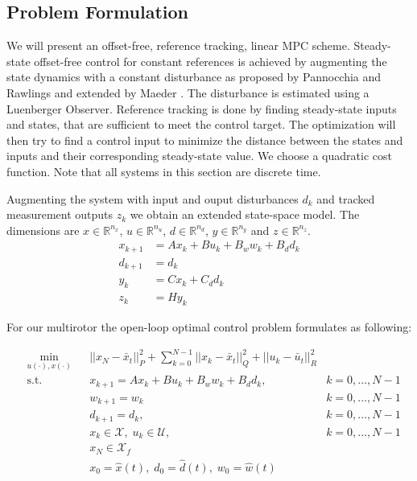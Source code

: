 \subsection{Problem Formulation}
We will present an offset-free, reference tracking, linear MPC scheme. Steady-state offset-free control for constant references is achieved by augmenting the state dynamics with a constant disturbance as proposed by Pannocchia and Rawlings and extended by Maeder \cite{Pannocchia2003a,Maeder2009}. The disturbance is estimated using a Luenberger Observer. Reference tracking is done by finding steady-state inputs and states, that are sufficient to meet the control target. The optimization will then try to find a control input to minimize the distance between the states and inputs and their corresponding steady-state value. We choose a quadratic cost function. Note that all systems in this section are discrete time. 

Augmenting the system with input and ouput disturbances $d_k$ and tracked measurement outputs $z_k$ we obtain an extended state-space model. The dimensions are $x\in\mathbb{R}^{n_x}$, $u\in\mathbb{R}^{n_u}$, $d\in\mathbb{R}^{n_d}$, $y\in\mathbb{R}^{n_y}$ and $z\in\mathbb{R}^{n_z}$.
\begin{align}
x_{k+1} &= A x_k + B u_k + B_w w_k + B_d d_k \label{eq:MPC_dt}\\
d_{k+1} &= d_k \nonumber \\ 
y_{k} &= C x_k + C_d d_k \nonumber \\
z_k &= H y_k 
\end{align}

For our multirotor the open-loop optimal control problem formulates as following:

\begin{align}
&\min_{u(\cdot),x(\cdot)}
& & ||x_N-\bar{x}_t||_P^2 + \sum_{k=0}^{N-1} ||x_k - \bar{x}_t||_Q^2 + ||u_k - \bar{u}_t||_R^2  \nonumber\\
& \text{s.t.} 
& & x_{k+1} = A x_k + B u_k + B_w w_k + B_d d_k, & k = 0, \ldots, N-1 \nonumber\\
& & & w_{k+1} = w_k  & k = 0, \ldots, N-1 \nonumber\\
& & & d_{k+1} = d_k, & k = 0, \ldots, N-1 \nonumber\\
& & & x_k \in \mathcal{X}, \; u_k \in \mathcal{U}, & k = 0, \ldots, N-1 \nonumber\\
& & & x_N \in \mathcal{X}_f \nonumber\\
& & & x_0 = \hat x (t), \; d_0 = \hat d(t), \; w_0 = \hat w(t) \label{eq:mpc_opti}
\end{align}

